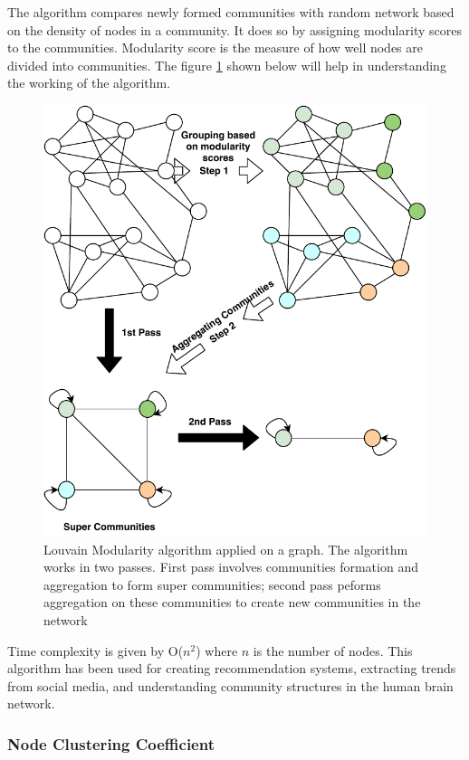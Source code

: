 \documentclass[journal,twoside,web]{ieeecolor}
\begin{document}
The algorithm compares newly formed communities with random network based on the density of nodes in a community. It does so by assigning modularity scores to the communities. Modularity score is the measure of how well nodes are divided into communities. The figure \ref{fig7} shown below will help in understanding the working of the algorithm.

\begin{figure}[!h]
    \centerline{\includegraphics[scale=0.7]{figures/louvain.pdf}}
    \caption{Louvain Modularity algorithm applied on a graph. The algorithm works in two passes. First pass involves communities formation and aggregation to form super communities; second pass peforms aggregation on these communities to create new communities in the network}
    \label{fig7}
\end{figure}

Time complexity is given by O($n^2$) where $n$ is the number of nodes. This algorithm has been used for creating recommendation systems\cite{55}, extracting trends from social media\cite{56}, and understanding community structures in the human brain network\cite{57}.

\subsubsection{Node Clustering Coefficient}
\end{document}
